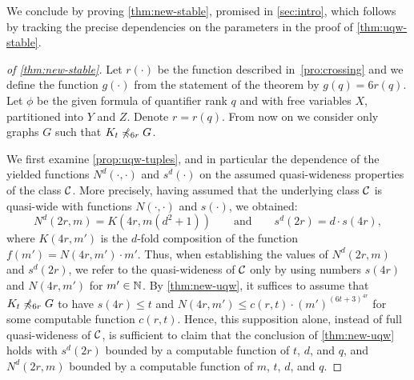 We conclude by proving \cref{thm:new-stable}, promised in \cref{sec:intro}, which follows by tracking the precise dependencies on the parameters in the proof of \cref{thm:uqw-stable}.

\begin{proof}[of \cref{thm:new-stable}]
  Let $r(\cdot)$ be the function described in~\cref{pro:crossing} and we 
  define the function $g(\cdot)$  from the statement of the theorem by $g(q)=6r(q)$.
	Let $\phi$ be the given formula of quantifier rank $q$ and with  free variables $X$, partitioned into $Y$ and $Z$.
  Denote $r=r(q)$. From now on we consider only graphs $G$ such that $K_t\not\preccurlyeq_{6r} G$.

We first examine \cref{prop:uqw-tuples}, and in particular the dependence of the yielded functions 
$N^d(\cdot,\cdot)$ and $s^d(\cdot)$ on the assumed quasi-wideness properties of the class $\mathcal{C}$.
More precisely, having assumed that the underlying class $\mathcal{C}$ is quasi-wide with functions $N(\cdot,\cdot)$ and $s(\cdot)$,
we obtained:
$$
N^d(2r,m)=K(4r,m(d^2+1))\qquad\textrm{and}\qquad s^d(2r)=d\cdot s(4r),
$$
where $K(4r,m')$ is the $d$-fold composition of the function $f(m')=N(4r,m')\cdot m'$.
Thus, when establishing the values of $N^d(2r,m)$ and $s^d(2r)$, we refer to the quasi-wideness of $\mathcal{C}$ only by using numbers $s(4r)$ and $N(4r,m')$ for $m'\in \mathbb{N}$.
By \cref{thm:new-uqw}, it suffices to assume that $K_t\not\preccurlyeq_{6r} G$ to have $s(4r)\leq t$ and $N(4r,m')\leq c(r,t)\cdot (m')^{(6t+3)^{4r}}$ for some computable function $c(r,t)$.
Hence, this supposition alone, instead of full quasi-wideness of $\mathcal{C}$, is sufficient to claim that the conclusion of \cref{thm:new-uqw} holds with
$s^d(2r)$ bounded by a computable function of $t$, $d$, and $q$, and $N^d(2r,m)$ bounded by a computable function of $m$, $t$, $d$, and $q$.

	

\end{proof}
